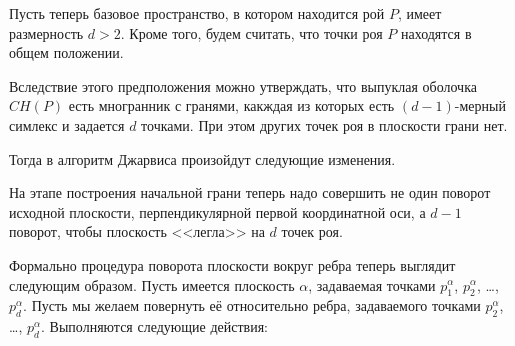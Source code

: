 \documentclass[14pt]{extarticle}
\begin{document}
Пусть теперь базовое пространство, в котором находится рой $P$, имеет размерность $d > 2$. Кроме того, будем считать, что точки роя $P$ находятся в общем положении.

Вследствие этого предположения можно утверждать, что выпуклая оболочка $CH(P)$ есть многранник с гранями, какждая из которых есть $(d-1)$-мерный симлекс и задается $d$ точками. При этом других точек роя в плоскости грани нет.

Тогда в алгоритм Джарвиса произойдут следующие изменения.

На этапе построения начальной грани теперь надо совершить не один поворот исходной плоскости, перпендикулярной первой координатной оси, а $d-1$ поворот, чтобы плоскость <<легла>> на $d$ точек роя.

Формально процедура поворота плоскости вокруг ребра теперь выглядит следующим образом. Пусть имеется плоскость $\alpha$, задаваемая точками $p^\alpha_1$, $p^\alpha_2$, \ldots, $p^\alpha_d$. Пусть мы желаем повернуть её относительно ребра, задаваемого точками $p^\alpha_2$, \ldots, $p^\alpha_d$. Выполняются следующие действия:
%
\end{document}
